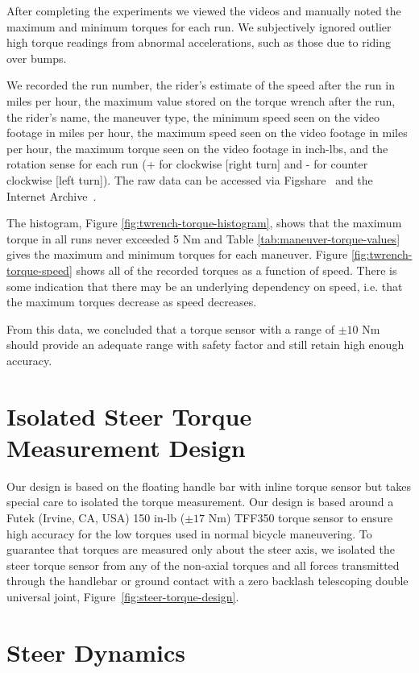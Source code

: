 \documentclass[10pt]{article}
\begin{document}
After completing the experiments we viewed the videos and manually noted the
maximum and minimum torques for each run. We subjectively ignored outlier high
torque readings from abnormal accelerations, such as those due to riding over
bumps.

We recorded the run number, the rider’s estimate of the speed after the run in
miles per hour, the maximum value stored on the torque wrench after the run,
the rider’s name, the maneuver type, the minimum speed seen on the video
footage in miles per hour, the maximum speed seen on the video footage in miles
per hour, the maximum torque seen on the video footage in inch-lbs, and the
rotation sense for each run (+ for clockwise [right turn] and - for counter
clockwise [left turn]). The raw data can be accessed via Figshare~\cite{}
and the Internet Archive~\cite{}.

The histogram, Figure \ref{fig:twrench-torque-histogram}, shows that the
maximum torque in all runs never exceeded 5 Nm and Table
\ref{tab:maneuver-torque-values} gives the maximum and minimum torques for each
maneuver. Figure \ref{fig:twrench-torque-speed} shows all of the recorded
torques as a function of speed. There is some indication that there may be an
underlying dependency on speed, i.e. that the maximum torques decrease as speed
decreases.

From this data, we concluded that a torque sensor with a range of $\pm10$ Nm
should provide an adequate range with safety factor and still retain high
enough accuracy.

\section*{Isolated Steer Torque Measurement Design}

Our design is based on the floating handle bar with inline torque sensor but
takes special care to isolated the torque measurement. Our design is based
around a Futek (Irvine, CA, USA) 150 in-lb ($\pm 17$ Nm) TFF350 torque sensor
to ensure high accuracy for the low torques used in normal bicycle maneuvering.
To guarantee that torques are measured only about the steer axis, we isolated
the steer torque sensor from any of the non-axial torques and all forces
transmitted through the handlebar or ground contact with a zero backlash
telescoping double universal joint, Figure~\ref{fig:steer-torque-design}.


\section*{Steer Dynamics}
\label{sec:steer-dynamics}
\end{document}
